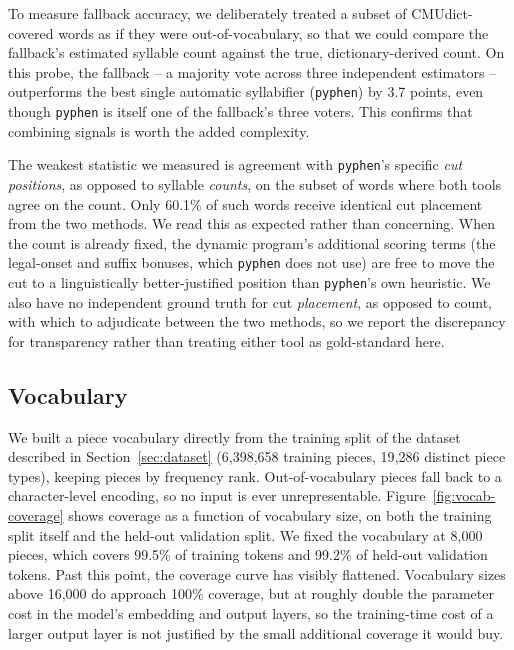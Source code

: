 \documentclass[11pt]{article}
\begin{document}
To measure fallback accuracy, we deliberately treated a subset of CMUdict-covered words as if they were out-of-vocabulary, so that we could compare the fallback's estimated syllable count against the true, dictionary-derived count. On this probe, the fallback -- a majority vote across three independent estimators -- outperforms the best single automatic syllabifier (\texttt{pyphen}) by 3.7 points, even though \texttt{pyphen} is itself one of the fallback's three voters. This confirms that combining signals is worth the added complexity.

The weakest statistic we measured is agreement with \texttt{pyphen}'s specific \emph{cut positions}, as opposed to syllable \emph{counts}, on the subset of words where both tools agree on the count. Only 60.1\% of such words receive identical cut placement from the two methods. We read this as expected rather than concerning. When the count is already fixed, the dynamic program's additional scoring terms (the legal-onset and suffix bonuses, which \texttt{pyphen} does not use) are free to move the cut to a linguistically better-justified position than \texttt{pyphen}'s own heuristic. We also have no independent ground truth for cut \emph{placement}, as opposed to count, with which to adjudicate between the two methods, so we report the discrepancy for transparency rather than treating either tool as gold-standard here.

\subsection{Vocabulary}

We built a piece vocabulary directly from the training split of the dataset described in Section~\ref{sec:dataset} (6{,}398{,}658 training pieces, 19{,}286 distinct piece types), keeping pieces by frequency rank. Out-of-vocabulary pieces fall back to a character-level encoding, so no input is ever unrepresentable. Figure~\ref{fig:vocab-coverage} shows coverage as a function of vocabulary size, on both the training split itself and the held-out validation split. We fixed the vocabulary at 8{,}000 pieces, which covers 99.5\% of training tokens and 99.2\% of held-out validation tokens. Past this point, the coverage curve has visibly flattened. Vocabulary sizes above 16{,}000 do approach 100\% coverage, but at roughly double the parameter cost in the model's embedding and output layers, so the training-time cost of a larger output layer is not justified by the small additional coverage it would buy.
\end{document}
